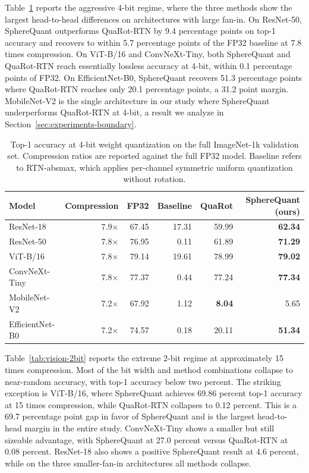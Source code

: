 Table~\ref{tab:vision-4bit} reports the aggressive 4-bit regime,
where the three methods show the largest head-to-head differences on
architectures with large fan-in. On ResNet-50, SphereQuant outperforms
QuaRot-RTN by 9.4 percentage points on top-1 accuracy and recovers to
within 5.7 percentage points of the FP32 baseline at 7.8 times
compression. On ViT-B/16 and ConvNeXt-Tiny, both SphereQuant and QuaRot-RTN
reach essentially lossless accuracy at 4-bit, within 0.1 percentage
points of FP32. On EfficientNet-B0, SphereQuant recovers 51.3 percentage points
where QuaRot-RTN reaches only 20.1 percentage points, a 31.2 point
margin. MobileNet-V2 is the single architecture in our study where
SphereQuant underperforms QuaRot-RTN at 4-bit, a result we analyze in
Section~\ref{sec:experiments-boundary}.

\begin{table}[t]
\centering
\caption{Top-1 accuracy at 4-bit weight quantization on the full
ImageNet-1k validation set. Compression ratios are reported against
the full FP32 model. Baseline refers to RTN-absmax, which applies
per-channel symmetric uniform quantization without rotation.}
\label{tab:vision-4bit}
\begin{tabular}{lrrrrr}
\hline
Model & Compression & FP32 & Baseline & QuaRot & SphereQuant (ours) \\
\hline
ResNet-18 & 7.9$\times$ & 67.45 & 17.31 & 59.99 & \textbf{62.34} \\
ResNet-50 & 7.8$\times$ & 76.95 & 0.11 & 61.89 & \textbf{71.29} \\
ViT-B/16 & 7.8$\times$ & 79.14 & 19.61 & 78.99 & \textbf{79.02} \\
ConvNeXt-Tiny & 7.8$\times$ & 77.37 & 0.44 & 77.24 & \textbf{77.34} \\
MobileNet-V2 & 7.2$\times$ & 67.92 & 1.12 & \textbf{8.04} & 5.65 \\
EfficientNet-B0 & 7.2$\times$ & 74.57 & 0.18 & 20.11 & \textbf{51.34} \\
\hline
\end{tabular}
\end{table}

Table~\ref{tab:vision-2bit} reports the extreme 2-bit regime at
approximately 15 times compression. Most of the bit width and method
combinations collapse to near-random accuracy, with top-1 accuracy
below two percent. The striking exception is ViT-B/16, where SphereQuant
achieves 69.86 percent top-1 accuracy at 15 times compression, while
QuaRot-RTN collapses to 0.12 percent. This is a 69.7 percentage point
gap in favor of SphereQuant and is the largest head-to-head margin in the
entire study. ConvNeXt-Tiny shows a smaller but still sizeable
advantage, with SphereQuant at 27.0 percent versus QuaRot-RTN at 0.08 percent.
ResNet-18 also shows a positive SphereQuant result at 4.6 percent, while on
the three smaller-fan-in architectures all methods collapse.

